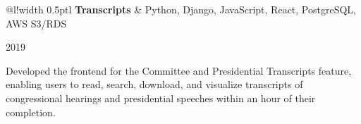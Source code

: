 \documentclass[]{article}
\newcommand\VRule{\color{lightgray}\vrule width 0.5pt}
\begin{document}

\begin{tabular}{@{}l!{\VRule}l}
	{\bf Transcripts} & Python, Django, JavaScript, React, PostgreSQL, AWS S3/RDS\\
\end{tabular}\hfill{\footnotesize 2019}

Developed the frontend for the Committee and Presidential Transcripts feature, enabling users to read, search, download, and visualize transcripts of congressional hearings and presidential speeches within an hour of their completion.\\

\end{document}

